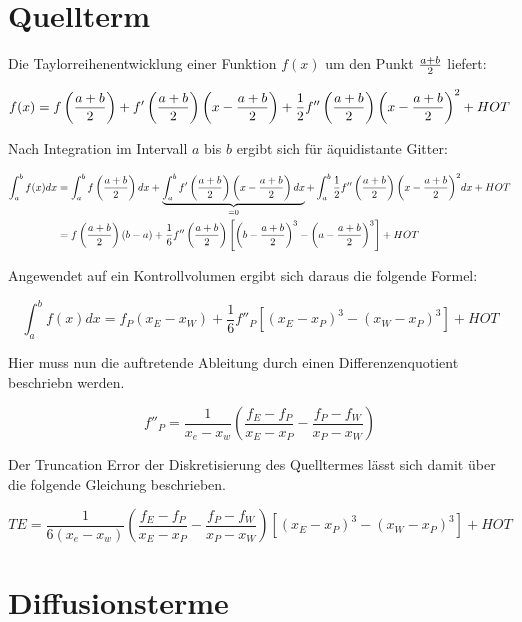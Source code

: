 \documentclass[10pt, ngerman,colorback,accentcolor=tud2d]{tudreport}
\begin{document}
\section{Quellterm}
\label{sec:Quellterm}


Die Taylorreihenentwicklung einer Funktion $f(x)$ um den Punkt $\frac{a+b}{2}$
liefert:

\begin{equation*}
  f(x) = f\left(\frac{a+b}{2}\right) +
  f'\left(\frac{a+b}{2}\right)\left(x-\frac{a+b}{2}\right) +
  \frac{1}{2}f''\left(\frac{a+b}{2}\right){\left(x-\frac{a+b}{2}\right)}^2 + HOT
\end{equation*}

Nach Integration im Intervall $a$ bis $b$ ergibt sich für äquidistante Gitter:

\begin{align*}
  \int_a^b f(x) dx &= \int_a^b f\left(\frac{a+b}{2}\right) dx +
  \underbrace{\int_a^b f'\left(\frac{a+b}{2}\right) \left( x - \frac{a+b}{2}\right) dx}_{=0} +
  \int_a^b \frac{1}{2}f''\left(\frac{a+b}{2}\right){\left(x-\frac{a+b}{2}\right)}^2 dx + HOT\\
  &= f\left(\frac{a+b}{2}\right) (b-a) + \frac{1}{6} f''\left(\frac{a+b}{2}\right)
  \left[\left( b-\frac{a+b}{2} \right)^3 - \left(a-\frac{a+b}{2}\right)^3 \right] + HOT
\end{align*}

Angewendet auf ein Kontrollvolumen ergibt sich daraus die folgende Formel:

\begin{equation*}
  \int_a^b f(x)dx = f_P(x_E-x_W) + \frac{1}{6} f''_P \left[{{(x_E-x_P)}^3-{(x_W-x_P)}^3}\right] + HOT
\end{equation*}

Hier muss nun die auftretende Ableitung durch einen Differenzenquotient beschriebn werden.

\begin{equation*}
  f''_P = \frac{1}{x_e-x_w}\left(\frac{f_E-f_P}{x_E-x_P}-\frac{f_P-f_W}{x_P-x_W}\right)
\end{equation*}

Der Truncation Error der Diskretisierung des Quelltermes lässt sich damit über die
folgende Gleichung beschrieben.

\begin{equation}
  TE = \frac{1}{6(x_e-x_w)}\left(\frac{f_E-f_P}{x_E-x_P}-\frac{f_P-f_W}{x_P-x_W}\right)
  \left[{{(x_E-x_P)}^3-{(x_W-x_P)}^3}\right] + HOT
\end{equation}


\section{Diffusionsterme}
\label{sec:Diffusionsterme}
\end{document}
